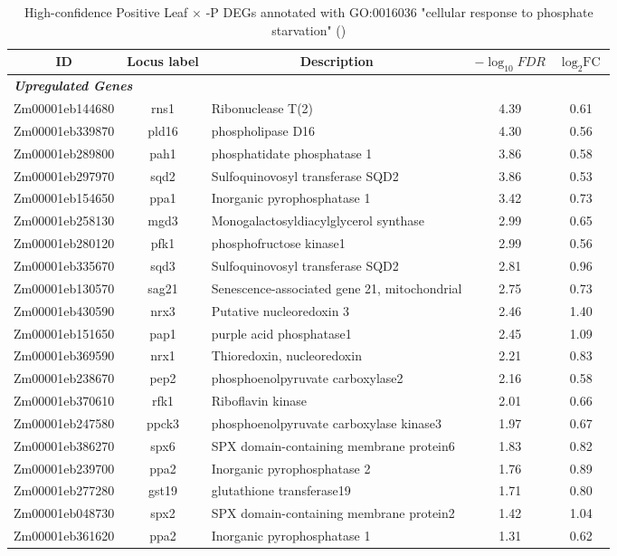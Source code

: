 \documentclass[9pt,twocolumn,twoside]{rilabRxiv}
\begin{document}
\clearpage
\begin{table}[h!]
\centering
\footnotesize
\caption{High-confidence Positive Leaf $\times$ -P DEGs annotated with GO:0016036 "cellular response to phosphate starvation" (\cite{fattel2024}) }
\label{table:goleafxP_genes}
\begin{tabular}{ccp{7.5cm}cc}
\hline
\textbf{ID} & \textbf{Locus label} & \multicolumn{1}{c}{\textbf{Description}} & \textbf{$-\log_{10}{\textit{FDR}}$} & \textbf{$\log_2{\text{FC}}$}\\
\hline
\multicolumn{5}{l}{\textit{\textbf{Upregulated Genes}}} \\
\hline
Zm00001eb144680 & rns1 & Ribonuclease T(2) & 4.39 & 0.61\\
Zm00001eb339870 & pld16 & phospholipase D16 & 4.30 & 0.56\\
Zm00001eb289800 & pah1 & phosphatidate phosphatase 1 & 3.86 & 0.58\\
Zm00001eb297970 & sqd2 & Sulfoquinovosyl transferase SQD2 & 3.86 & 0.53\\
Zm00001eb154650 & ppa1 & Inorganic pyrophosphatase 1 & 3.42 & 0.73\\
Zm00001eb258130 & mgd3 & Monogalactosyldiacylglycerol synthase & 2.99 & 0.65\\
Zm00001eb280120 & pfk1 & phosphofructose kinase1 & 2.99 & 0.56\\
Zm00001eb335670 & sqd3 & Sulfoquinovosyl transferase SQD2 & 2.81 & 0.96\\
Zm00001eb130570 & sag21 & Senescence-associated gene 21, mitochondrial & 2.75 & 0.73\\
Zm00001eb430590 & nrx3 & Putative nucleoredoxin 3 & 2.46 & 1.40\\
Zm00001eb151650 & pap1 & purple acid phosphatase1 & 2.45 & 1.09\\
Zm00001eb369590 & nrx1 & Thioredoxin, nucleoredoxin & 2.21 & 0.83\\
Zm00001eb238670 & pep2 & phosphoenolpyruvate carboxylase2 & 2.16 & 0.58\\
Zm00001eb370610 & rfk1 & Riboflavin kinase & 2.01 & 0.66\\
Zm00001eb247580 & ppck3 & phosphoenolpyruvate carboxylase kinase3 & 1.97 & 0.67\\
Zm00001eb386270 & spx6 & SPX domain-containing membrane protein6 & 1.83 & 0.82\\
Zm00001eb239700 & ppa2 & Inorganic pyrophosphatase 2 & 1.76 & 0.89\\
Zm00001eb277280 & gst19 & glutathione transferase19 & 1.71 & 0.80\\
Zm00001eb048730 & spx2 & SPX domain-containing membrane protein2 & 1.42 & 1.04\\
Zm00001eb361620 & ppa2 & Inorganic pyrophosphatase 1 & 1.31 & 0.62\\
\hline
\end{tabular}
\end{table}
\end{document}
